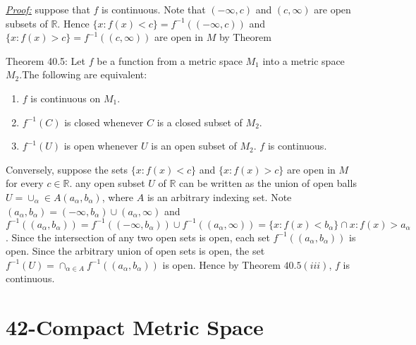 \documentclass{amsbook}
\begin{document}
\begin{tcolorbox}[enhanced,attach boxed title to top center={yshift=-3mm,yshifttext=-1mm},
  colback=blue!5!white,colframe=blue!75!black,colbacktitle=red!80!black,
  title=Exercise 40.15:,fonttitle=\bfseries,
  boxed title style={size=small,colframe=red!50!black} ]
     \textit{\color{blue}\underline{Proof:}}
suppose that $f$ is continuous. Note that $(-\infty,c)$ and $(c,\infty)$ are open subsets of $\mathbb{R}$. Hence
$\{x:f(x)<c\}=f^{-1}((-\infty,c))$ and 
$\{x:f(x)>c\}=f^{-1}((c,\infty))$ are open in $M$ by Theorem
\begin{tcolorbox}[colback=red!5!white,colframe=red!75!black]
{\color{red}Theorem 40.5:} Let $f$ be a function from a metric space $M_1$ into a metric space $M_2$.The 
following are equivalent:
\begin{enumerate}
     \item $f$ is continuous on $M_1$.
     \item $f^{-1}(C)$ is closed whenever $C$ is a closed subset of $M_2$.
     \item $f^{-1}(U)$ is open whenever $U$ is an open subset of $M_2$.
     $f$ is continuous.
\end{enumerate}
\end{tcolorbox}
Conversely, suppose the sets $\{x:f(x)<c\}$ and $\{x:f(x)>c\}$ are open in $M$ for every $c\in \mathbb{R}$. any 
open subset $U$ of $\mathbb{R}$ can
be written as the union of open balls $U=\cup_\alpha\in
A(a_\alpha,b_\alpha)$, where $A$ is an arbitrary indexing set. Note
$(a_\alpha,b_\alpha) = (-\infty,b_\alpha)\cup (a_\alpha,\infty)$ and 
$f^{-1}((a_\alpha,b_\alpha))=f^{-1}((-\infty,b_\alpha))\cup f^{-1}((a_\alpha,\infty)) 
= \{x:f(x)<b_\alpha\}\cap {x : f(x)>a_\alpha}$.
Since the intersection of any two open sets is open, each set $f^{-1}((a_\alpha,b_\alpha))$ is open. Since the 
arbitrary
union of open sets is open, the set $f^{-1}(U)=\cap_{\alpha\in A}f^{-1}((a_\alpha,b_\alpha))$ is open. Hence by 
Theorem $40.5(iii)$, $f$ is continuous.
\end{tcolorbox}


\section{42-Compact Metric Space}
\end{document}
